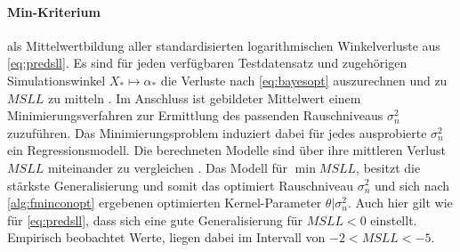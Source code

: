 \paragraph*{Min-Kriterium} als Mittelwertbildung aller standardisierten logarithmischen Winkelverluste aus \autoref{eq:predsll}. Es sind für jeden verfügbaren Testdatensatz und zugehörigen Simulationswinkel
$X_* \mapsto \alpha_*$ die Verluste nach \autoref{eq:bayesopt} auszurechnen und zu $MSLL$ zu mitteln \cite{Rasmussen2006}. Im Anschluss ist gebildeter Mittelwert einem Minimierungsverfahren zur Ermittlung des passenden Rauschniveaus $\sigma_n^2$ zuzuführen. Das Minimierungsproblem induziert dabei für jedes ausprobierte $\sigma_n^2$ ein Regressionsmodell. Die berechneten Modelle sind über ihre mittleren Verlust $MSLL$ miteinander zu vergleichen \cite{Rasmussen2006}. Das Modell für $\min MSLL$, besitzt die stärkste Generalisierung und somit das optimiert Rauschniveau $\sigma_n^2$ und sich nach \autoref{alg:fminconopt} ergebenen optimierten Kernel-Parameter $\theta|\sigma_n^2$. Auch hier gilt wie für \autoref{eq:predsll}, dass sich eine gute Generalisierung für $MSLL < 0$ einstellt. Empirisch beobachtet Werte, liegen dabei im Intervall von $-2 < MSLL < -5$.




